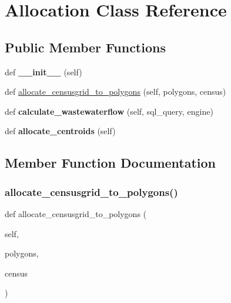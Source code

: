 \hypertarget{class_allocation_1_1_allocation}{}\section{Allocation Class Reference}
\label{class_allocation_1_1_allocation}
\subsection*{Public Member Functions}
\begin{DoxyCompactItemize}
\item 
\mbox{\label{class_allocation_1_1_allocation_ae64f0875afe3067b97ba370b354b9213}} 
def {\bfseries \+\_\+\+\_\+init\+\_\+\+\_\+} (self)
\item 
def \hyperlink{class_allocation_1_1_allocation_a4f3cfc22a96cefe107f4dd3385036d47}{allocate\+\_\+censusgrid\+\_\+to\+\_\+polygons} (self, polygons, census)
\item 
\mbox{\label{class_allocation_1_1_allocation_ac6d387ff27b96beb3969516234e66f97}} 
def {\bfseries calculate\+\_\+wastewaterflow} (self, sql\+\_\+query, engine)
\item 
\mbox{\label{class_allocation_1_1_allocation_aeec06a5d0d02edd0a7f51b59e7a3959e}} 
def {\bfseries allocate\+\_\+centroids} (self)
\end{DoxyCompactItemize}


\subsection{Member Function Documentation}
\mbox{\label{class_allocation_1_1_allocation_a4f3cfc22a96cefe107f4dd3385036d47}} 
\subsubsection{\texorpdfstring{allocate\+\_\+censusgrid\+\_\+to\+\_\+polygons()}{allocate\_censusgrid\_to\_polygons()}}
{\footnotesize\ttfamily def allocate\+\_\+censusgrid\+\_\+to\+\_\+polygons (\begin{DoxyParamCaption}\item[{}]{self,  }\item[{}]{polygons,  }\item[{}]{census }\end{DoxyParamCaption})}

